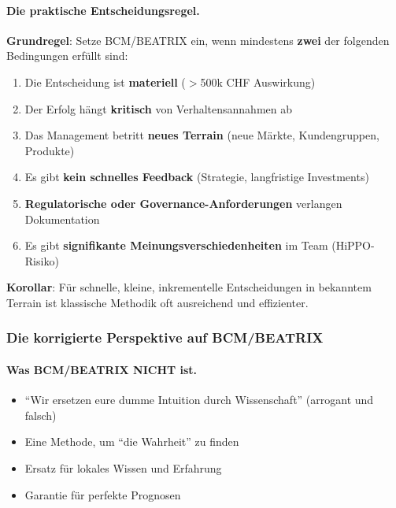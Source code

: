 \paragraph{Die praktische Entscheidungsregel.}

\begin{tcolorbox}[colback=yellow!5!white, colframe=yellow!75!black, title=Wann BCM/BEATRIX einsetzen?]
\textbf{Grundregel}: Setze BCM/BEATRIX ein, wenn mindestens \textbf{zwei} der folgenden Bedingungen erfüllt sind:
\begin{enumerate}
    \item Die Entscheidung ist \textbf{materiell} ($>$500k CHF Auswirkung)
    \item Der Erfolg hängt \textbf{kritisch} von Verhaltensannahmen ab
    \item Das Management betritt \textbf{neues Terrain} (neue Märkte, Kundengruppen, Produkte)
    \item Es gibt \textbf{kein schnelles Feedback} (Strategie, langfristige Investments)
    \item \textbf{Regulatorische oder Governance-Anforderungen} verlangen Dokumentation
    \item Es gibt \textbf{signifikante Meinungsverschiedenheiten} im Team (HiPPO-Risiko)
\end{enumerate}
\textbf{Korollar}: Für schnelle, kleine, inkrementelle Entscheidungen in bekanntem Terrain ist klassische Methodik oft ausreichend und effizienter.
\end{tcolorbox}

\subsubsection{Die korrigierte Perspektive auf BCM/BEATRIX}

\paragraph{Was BCM/BEATRIX NICHT ist.}
\begin{itemize}
    \item[$\times$] ``Wir ersetzen eure dumme Intuition durch Wissenschaft'' (arrogant und falsch)
    \item[$\times$] Eine Methode, um ``die Wahrheit'' zu finden
    \item[$\times$] Ersatz für lokales Wissen und Erfahrung
    \item[$\times$] Garantie für perfekte Prognosen
\end{itemize}

